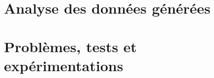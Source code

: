 \documentclass[
	headsepline=on,
	footsepline=on,
	twoside=off,
	abstract=on,
	DIV=10
]{scrreprt}
\begin{document}
		
		
		
		
		
		
		
		
		
		
		
	\part{Analyse des données générées}
	
	
	
	
	\part{Problèmes, tests et expérimentations}
	
\end{document}
